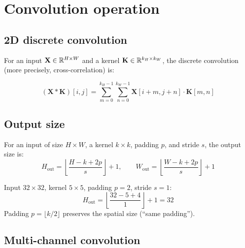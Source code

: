 \section{Convolution operation}
\label{sec:convolution}

\subsection{2D discrete convolution}

For an input $\mathbf{X} \in \mathbb{R}^{H \times W}$ and a kernel
$\mathbf{K} \in \mathbb{R}^{k_H \times k_W}$, the discrete convolution
(more precisely, cross-correlation) is:

\begin{keyformulas}[title=\textbf{2D Convolution}]
\begin{equation}
(\mathbf{X} * \mathbf{K})[i, j] = \sum_{m=0}^{k_H - 1} \sum_{n=0}^{k_W - 1}
  \mathbf{X}[i + m, j + n] \cdot \mathbf{K}[m, n]
\label{eq:conv2d}
\end{equation}
\end{keyformulas}

\subsection{Output size}

\begin{theorem}
For an input of size $H \times W$, a kernel $k \times k$, padding
$p$, and stride $s$, the output size is:
\begin{equation}
H_{\text{out}} = \left\lfloor \frac{H - k + 2p}{s} \right\rfloor + 1, \qquad
W_{\text{out}} = \left\lfloor \frac{W - k + 2p}{s} \right\rfloor + 1
\label{eq:conv-output-size}
\end{equation}
\end{theorem}

\begin{example}
Input $32 \times 32$, kernel $5 \times 5$, padding $p = 2$, stride $s = 1$:
\[
H_{\text{out}} = \left\lfloor \frac{32 - 5 + 4}{1} \right\rfloor + 1 = 32
\]
Padding $p = \lfloor k/2 \rfloor$ preserves the spatial size
(``same padding'').
\end{example}

\subsection{Multi-channel convolution}


